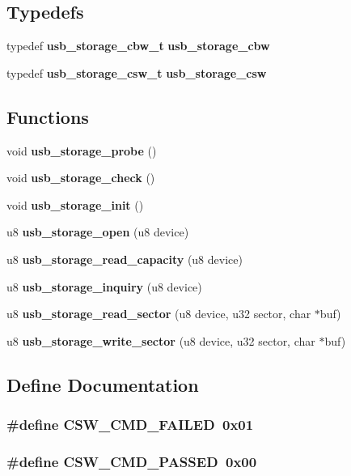 \subsection*{Typedefs}
\begin{CompactItemize}
\item 
typedef {\bf usb\_\-storage\_\-cbw\_\-t} {\bf usb\_\-storage\_\-cbw}
\item 
typedef {\bf usb\_\-storage\_\-csw\_\-t} {\bf usb\_\-storage\_\-csw}
\end{CompactItemize}
\subsection*{Functions}
\begin{CompactItemize}
\item 
void {\bf usb\_\-storage\_\-probe} ()
\item 
void {\bf usb\_\-storage\_\-check} ()
\item 
void {\bf usb\_\-storage\_\-init} ()
\item 
u8 {\bf usb\_\-storage\_\-open} (u8 device)
\item 
u8 {\bf usb\_\-storage\_\-read\_\-capacity} (u8 device)
\item 
u8 {\bf usb\_\-storage\_\-inquiry} (u8 device)
\item 
u8 {\bf usb\_\-storage\_\-read\_\-sector} (u8 device, u32 sector, char $\ast$buf)
\item 
u8 {\bf usb\_\-storage\_\-write\_\-sector} (u8 device, u32 sector, char $\ast$buf)
\end{CompactItemize}


\subsection{Define Documentation}
\subsubsection{\setlength{\rightskip}{0pt plus 5cm}\#define CSW\_\-CMD\_\-FAILED~0x01}\label{storage_8h_23b45004778ff0ce250cb515f18dad5c}


\subsubsection{\setlength{\rightskip}{0pt plus 5cm}\#define CSW\_\-CMD\_\-PASSED~0x00}\label{storage_8h_003fe6041f1af12ae0e82bd653294389}


